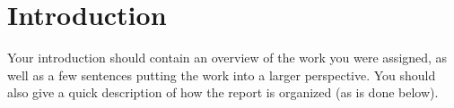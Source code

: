 \section{Introduction}Your introduction should contain an overview of the work you were assigned, as well as a few sentences putting the work into a larger perspective. You should also give a quick description of how the report is organized (as is done below).

